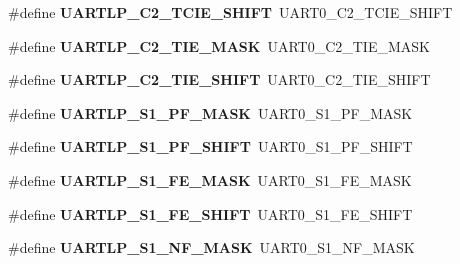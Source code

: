 \begin{DoxyCompactItemize}
\#define {\bfseries U\+A\+R\+T\+L\+P\+\_\+\+C2\+\_\+\+T\+C\+I\+E\+\_\+\+S\+H\+I\+FT}~U\+A\+R\+T0\+\_\+\+C2\+\_\+\+T\+C\+I\+E\+\_\+\+S\+H\+I\+FT
\item 
\mbox{\label{group___backward___compatibility___symbols_ga8b17a7eada73c13310ee58bd2f2791d5}} 
\#define {\bfseries U\+A\+R\+T\+L\+P\+\_\+\+C2\+\_\+\+T\+I\+E\+\_\+\+M\+A\+SK}~U\+A\+R\+T0\+\_\+\+C2\+\_\+\+T\+I\+E\+\_\+\+M\+A\+SK
\item 
\mbox{\label{group___backward___compatibility___symbols_ga151bc121eebeab1b1e5e3b989d513f18}} 
\#define {\bfseries U\+A\+R\+T\+L\+P\+\_\+\+C2\+\_\+\+T\+I\+E\+\_\+\+S\+H\+I\+FT}~U\+A\+R\+T0\+\_\+\+C2\+\_\+\+T\+I\+E\+\_\+\+S\+H\+I\+FT
\item 
\mbox{\label{group___backward___compatibility___symbols_ga5e7d9c4c91cbaa076c560376f15f6da1}} 
\#define {\bfseries U\+A\+R\+T\+L\+P\+\_\+\+S1\+\_\+\+P\+F\+\_\+\+M\+A\+SK}~U\+A\+R\+T0\+\_\+\+S1\+\_\+\+P\+F\+\_\+\+M\+A\+SK
\item 
\mbox{\label{group___backward___compatibility___symbols_ga3364f49f1cc96aeb4df770a1e2386bbe}} 
\#define {\bfseries U\+A\+R\+T\+L\+P\+\_\+\+S1\+\_\+\+P\+F\+\_\+\+S\+H\+I\+FT}~U\+A\+R\+T0\+\_\+\+S1\+\_\+\+P\+F\+\_\+\+S\+H\+I\+FT
\item 
\mbox{\label{group___backward___compatibility___symbols_gada862f5e1e23eb050abaa6542986b29b}} 
\#define {\bfseries U\+A\+R\+T\+L\+P\+\_\+\+S1\+\_\+\+F\+E\+\_\+\+M\+A\+SK}~U\+A\+R\+T0\+\_\+\+S1\+\_\+\+F\+E\+\_\+\+M\+A\+SK
\item 
\mbox{\label{group___backward___compatibility___symbols_ga7da4840dcbf8ee4f76867052d4b2be53}} 
\#define {\bfseries U\+A\+R\+T\+L\+P\+\_\+\+S1\+\_\+\+F\+E\+\_\+\+S\+H\+I\+FT}~U\+A\+R\+T0\+\_\+\+S1\+\_\+\+F\+E\+\_\+\+S\+H\+I\+FT
\item 
\mbox{\label{group___backward___compatibility___symbols_gadb12f094eea34062c806a23793565545}} 
\#define {\bfseries U\+A\+R\+T\+L\+P\+\_\+\+S1\+\_\+\+N\+F\+\_\+\+M\+A\+SK}~U\+A\+R\+T0\+\_\+\+S1\+\_\+\+N\+F\+\_\+\+M\+A\+SK

\end{DoxyCompactItemize}
